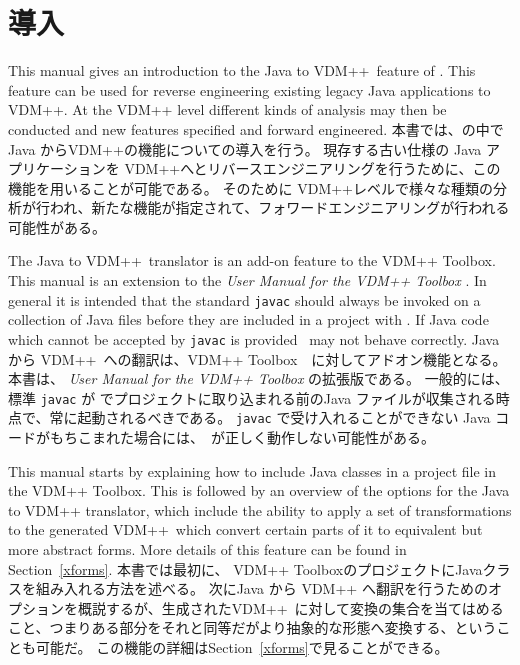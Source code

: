\documentclass[\pformat,12pt]{jarticle}
\newcommand{\vdmslpp}{VDM++}
\newcommand{\ToolboxName}{VDM++ Toolbox}
\begin{document}
\vdmtoolsmanualscsk{Java → \vdmslpp\ ユーザマニュアル}{2.0}
 

\section{導入} \label{sec:introduction}

This manual gives an introduction to the Java to \vdmslpp\ feature
of \VDMTools. This feature can be used for reverse
engineering existing legacy Java applications to VDM++. At the VDM++
level different kinds of analysis may then be conducted and new
features specified and forward engineered.
本書では、\VDMTools の中で Java から\vdmslpp の機能についての導入を行う。
現存する古い仕様の Java アプリケーションを VDM++へとリバースエンジニアリングを行うために、この機能を用いることが可能である。
そのために VDM++レベルで様々な種類の分析が行われ、新たな機能が指定されて、フォワードエンジニアリングが行われる可能性がある。

The Java to \vdmslpp\ translator is an add-on feature to the
\ToolboxName{}. This manual is an extension to the {\em User Manual
  for the VDM++ Toolbox} \cite{UserManPP-SCSK}. In general it is
intended that the standard \texttt{javac} should always be invoked on
a collection of Java files 
before they are included in a project with \VDMTools. If Java code
which cannot be accepted by \texttt{javac} is provided \VDMTools\ may
not behave correctly.
 Java から \vdmslpp\ への翻訳は、\ToolboxName{}　に対してアドオン機能となる。
本書は、 {\em User Manual for the VDM++ Toolbox} \cite{UserManPP-SCSK}の拡張版である。
一般的には、標準 \texttt{javac} が \VDMTools でプロジェクトに取り込まれる前のJava ファイルが収集される時点で、常に起動されるべきである。
 \texttt{javac} で受け入れることができない Java コードがもちこまれた場合には、\VDMTools\ が正しく動作しない可能性がある。

This manual starts by explaining how to include Java classes in a
project file in the \ToolboxName{}. This is followed by an overview of the
options for the Java to VDM++ translator, which include the ability to
apply a set of transformations to the generated \vdmslpp\ which
convert certain parts of it to equivalent but more abstract
forms. More details of this feature can be found in Section~\ref{xforms}.
本書では最初に、 \ToolboxName{}のプロジェクトにJavaクラスを組み入れる方法を述べる。
次にJava から VDM++ へ翻訳を行うためのオプションを概説するが、生成された\vdmslpp\ に対して変換の集合を当てはめること、つまりある部分をそれと同等だがより抽象的な形態へ変換する、ということも可能だ。
この機能の詳細はSection~\ref{xforms}で見ることができる。
\end{document}
